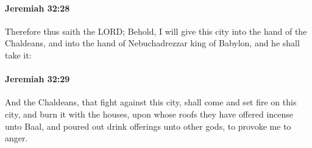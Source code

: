 		\paragraph{Jeremiah 32:28} %
			\label{JEREMIAH-32-28}

			Therefore thus saith the LORD; Behold, I will give this city into the hand of the Chaldeans, and into the hand of Nebuchadrezzar king of Babylon, and he shall take it:


		\paragraph{Jeremiah 32:29} %
			\label{JEREMIAH-32-29}

			And the Chaldeans, that fight against this city, shall come and set fire on this city, and burn it with the houses, upon whose roofs they have offered incense unto Baal, and poured out drink offerings unto other gods, to provoke me to anger.

